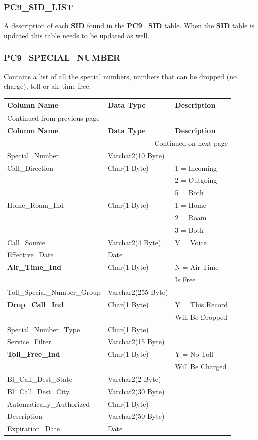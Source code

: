 \documentclass[12pt,twoside]{article}
\begin{document}
\normalsize
\subsubsection{PC9\_SID\_LIST}
\label{sec:orgheadline53}
A description of each \textbf{SID} found in the \textbf{PC9\_SID} table.
When the \textbf{SID} table is updated this table needs to be
updated as well.

\subsubsection{PC9\_SPECIAL\_NUMBER}
\label{sec:orgheadline54}
Contains a list of all the special numbers, numbers that can
be dropped (no charge), toll or air time free.
\footnotesize

\begin{longtable}{l|l|l}
\hline
\textbf{Column Name} & \textbf{Data Type} & \textbf{Description}\\
\hline
\endfirsthead
\multicolumn{3}{l}{Continued from previous page} \\
\hline

\textbf{Column Name} & \textbf{Data Type} & \textbf{Description} \\

\hline
\endhead
\hline\multicolumn{3}{r}{Continued on next page} \\
\endfoot
\endlastfoot
\hline
Special\_Number & Varchar2(10 Byte) & \\
Call\_Direction & Char(1 Byte) & 1 = Incoming\\
 &  & 2 = Outgoing\\
 &  & 5 = Both\\
Home\_Roam\_Ind & Char(1 Byte) & 1 = Home\\
 &  & 2 = Roam\\
 &  & 3 = Both\\
Call\_Source & Varchar2(4 Byte) & V = Voice\\
Effective\_Date & Date & \\
\textbf{Air\_Time\_Ind} & Char(1 Byte) & N = Air Time\\
 &  & Is Free\\
Toll\_Special\_Number\_Group & Varchar2(255 Byte) & \\
\textbf{Drop\_Call\_Ind} & Char(1 Byte) & Y = This Record\\
 &  & Will Be Dropped\\
Special\_Number\_Type & Char(1 Byte) & \\
Service\_Filter & Varchar2(15 Byte) & \\
\textbf{Toll\_Free\_Ind} & Char(1 Byte) & Y = No Toll\\
 &  & Will Be Charged\\
Bl\_Call\_Dest\_State & Varchar2(2 Byte) & \\
Bl\_Call\_Dest\_City & Varchar2(30 Byte) & \\
Automatically\_Authorized & Char(1 Byte) & \\
Description & Varchar2(50 Byte) & \\
Expiration\_Date & Date & \\
\hline
\end{longtable}
\end{document}
